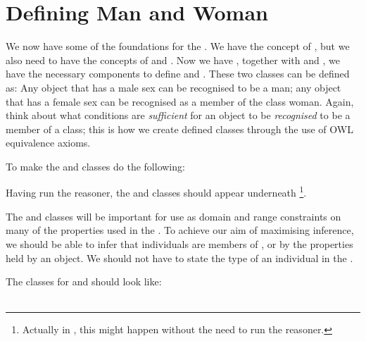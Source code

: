 \section{Defining Man and Woman}

We now have some of the foundations  for the \fhkb. We have the concept of \person, but we also need to have the concepts of \man and \woman. Now we have \person, together with \male and \female, we have the necessary components to define \man and \woman. These two classes can be defined as:
Any \person object that has a male sex can be recognised to be a man; any \person object that has a female sex can be recognised as a member of the class woman. Again, think about what conditions are \emph{sufficient} for an object to be \emph{recognised} to be a member of a class; this is how we create defined classes through the use of OWL equivalence axioms.

To make the \man and \woman classes do the following:

 \noindent Having run the reasoner, the \man and \woman classes should appear underneath \person \footnote{Actually in \protege, this might happen without the need to run the reasoner.}.

The \man and \woman classes will be important for use as domain and range constraints on many of the properties used in the \fhkb. To achieve our aim of maximising inference, we should be able to infer that individuals are members of \man, \woman or \person by the properties held by an object. We should not have to state the type of an individual in the \fhkb.
 
The classes for \man and \woman should look like:\\\\

